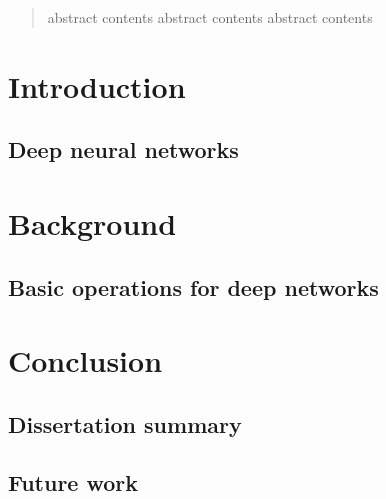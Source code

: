 \documentclass[11pt]{report}
\begin{document}

\begin{titlepage}

\end{titlepage}

\begin{abstract}\setcounter{page}{3}
abstract contents abstract contents abstract contents
\end{abstract}\setcounter{page}{5}

{
\tableofcontents
\listoffigures{}
\listoftables{}
}

\chapter{Introduction}\label{c:intro}

\section{Deep neural networks}

\cite{Gatys15,Noh15,Weston15}

\chapter{Background}\label{c:background}

\section{Basic operations for deep networks}

\chapter{Conclusion}\label{c:con}

\section{Dissertation summary}

\section{Future work}


\end{document}
